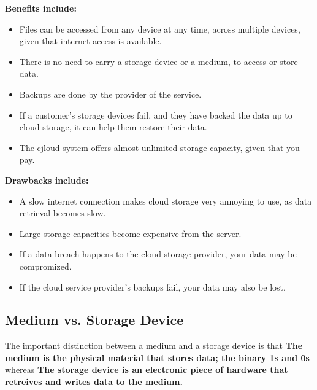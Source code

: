 \documentclass[../main.tex]{subfiles}
\begin{document}
\textbf{Benefits include:}

\begin{itemize}
    \item Files can be accessed from any device at any time, across multiple devices, given that internet access is available.
    \item There is no need to carry a storage device or a medium, to access or store data.
    \item Backups are done by the provider of the service.
    \item If a customer's storage devices fail, and they have backed the data up to cloud storage, it can help them restore their data.
    \item The cjloud system offers almost unlimited storage capacity, given that you pay.
\end{itemize}

\textbf{Drawbacks include:}

\begin{itemize}
    \item A slow internet connection makes cloud storage very annoying to use, as data retrieval becomes slow.
    \item Large storage capacities become expensive from the server.
    \item If a data breach happens to the cloud storage provider, your data may be compromized.
    \item If the cloud service provider's backups fail, your data may also be lost.
\end{itemize}

\subsection{Medium vs. Storage Device}
\label{3:sec:medium_vs_storage_device}

The important distinction between a medium and a storage device is that \textbf{The medium is the physical material that stores data; the binary 1s and 0s} whereas \textbf{The storage device is an electronic piece of hardware that retreives and writes data to the medium.} 
\end{document}
